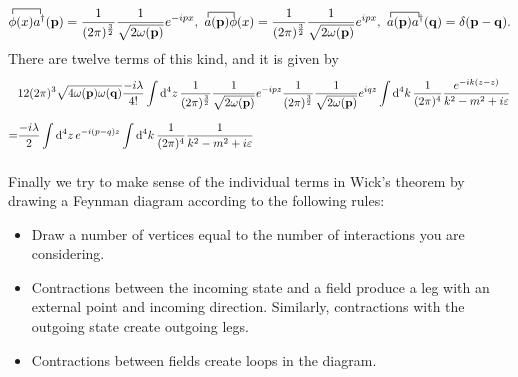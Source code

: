\begin{align*}
	\contraction{}{\phi}{(x)}{a\adj}\phi(x)a\adj(\vb{p}) = \frac{1}{(2\pi)^{\frac{3}{2}}}\frac{1}{\sqrt{2\omega(\vb{p})}}e^{-ipx},\ \contraction{}{a}{(\vb{p})}{\phi}a(\vb{p})\phi(x) = \frac{1}{(2\pi)^{\frac{3}{2}}}\frac{1}{\sqrt{2\omega(\vb{p})}}e^{ipx},\ \contraction{}{a}{(\vb{p})}{a\adj}a(\vb{p})a\adj(\vb{q}) = \delta(\vb{p} - \vb{q}).
\end{align*}
There are twelve terms of this kind, and it is given by
\begin{align*}
	&12(2\pi)^{3}\sqrt{4\omega(\vb{p})\omega(\vb{q})}\frac{-i\lambda}{4!}\int\limits_{}^{}\dd[4]{z}\frac{1}{(2\pi)^{\frac{3}{2}}}\frac{1}{\sqrt{2\omega(\vb{p})}}e^{-ipz}\frac{1}{(2\pi)^{\frac{3}{2}}}\frac{1}{\sqrt{2\omega(\vb{p})}}e^{iqz}\int\limits_{}^{}\dd[4]{k}\frac{1}{(2\pi)^{4}}\frac{e^{-ik(z - z)}}{k^{2} - m^{2} + i\varepsilon} \\
	=& \frac{-i\lambda}{2}\int\limits_{}^{}\dd[4]{z}e^{-i(p - q)z}\int\limits_{}^{}\dd[4]{k}\frac{1}{(2\pi)^{4}}\frac{1}{k^{2} - m^{2} + i\varepsilon}
\end{align*}

Finally we try to make sense of the individual terms in Wick's theorem by drawing a Feynman diagram according to the following rules:
\begin{itemize}
	\item Draw a number of vertices equal to the number of interactions you are considering.
	\item Contractions between the incoming state and a field produce a leg with an external point and incoming direction. Similarly, contractions with the outgoing state create outgoing legs.
	\item Contractions between fields create loops in the diagram.
\end{itemize}


